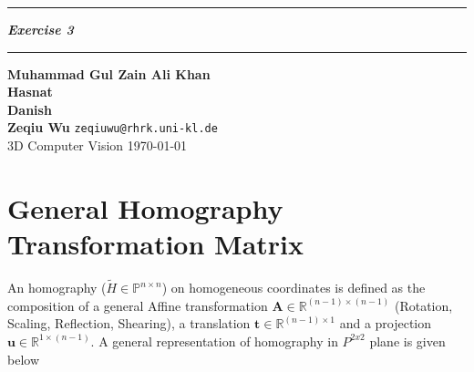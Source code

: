 \documentclass{article}
\newcommand{\squishlist}{
 \begin{list}{$\bullet$}
  { \setlength{\itemsep}{0pt}
     \setlength{\parsep}{3pt}
     \setlength{\topsep}{3pt}
     \setlength{\partopsep}{0pt}
     \setlength{\leftmargin}{1.5em}
     \setlength{\labelwidth}{1em}
     \setlength{\labelsep}{0.5em} } }
\newcommand{\squishend}{
  \end{list}  }
\begin{document}
 \def\maketitle{%
 \thispagestyle{plain}
 \vspace{-10ex}
 \hrule
 \bigskip
 \begin{center}
 {\Large{\textbf{\@title}}}
 \end{center}
 \bigskip
 \hrule

 \bigskip

 \begin{flushleft}
 \textbf{\normalsize{Muhammad Gul Zain Ali Khan}} 
 \\
 \vspace{5pt}
 \textbf{\normalsize{Hasnat}} 
 \\
 \vspace{5pt}
 \textbf{\normalsize{Danish}}
 \\
\vspace{5pt}
 \textbf{\normalsize{Zeqiu Wu}} \hfill \texttt{zeqiuwu@rhrk.uni-kl.de}
 \\
 \vspace{5pt}
 3D Computer Vision \vspace{5pt}
\hfill \today \\ 
 \end{flushleft}
 }
\def\title#1{\def\@title{#1}}
\title{\textit{Exercise 3}}



\maketitle

\section{General Homography Transformation Matrix}
An homography ($\tilde{H} \in \mathbb{P}^{n \times n}$) on homogeneous coordinates is defined as the composition of a general Affine transformation $\mathbf{A} \in \mathbb{R}^{(n - 1) \times (n - 1)}$ (Rotation, Scaling, Reflection, Shearing), a translation $\mathbf{t} \in \mathbb{R}^{(n - 1) \times 1}$ and a projection $\mathbf{u} \in \mathbb{R}^{1 \times (n - 1)}$. A general representation of homography in \(P^{2x2}\) plane is given below
\end{document}
